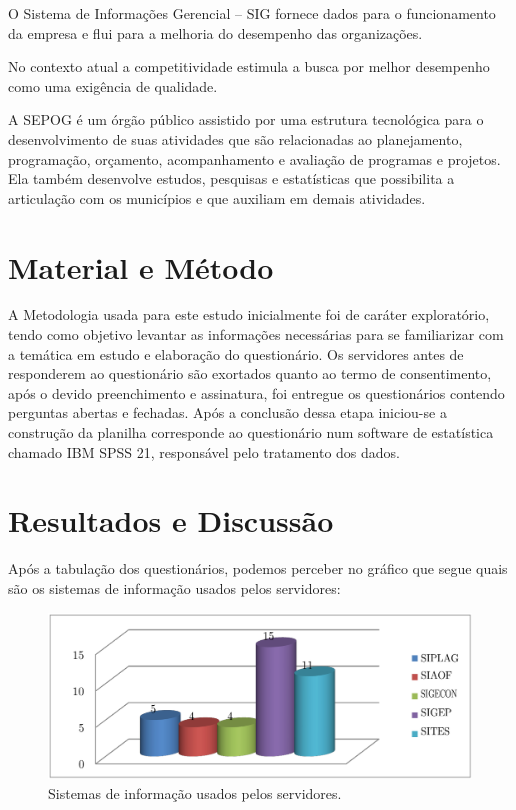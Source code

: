 \documentclass[article,12pt,onesidea,4paper,english,brazil]{abntex2}
\begin{document}
	O Sistema de Informações Gerencial – SIG fornece dados para o funcionamento da empresa e flui para a melhoria do desempenho das organizações.
	
	No contexto atual a competitividade estimula a busca por melhor desempenho como uma exigência de qualidade.
	
	A SEPOG é um órgão público assistido por uma estrutura tecnológica para o desenvolvimento de suas atividades que são relacionadas ao planejamento, programação, orçamento, acompanhamento e avaliação de programas e projetos. Ela também desenvolve estudos, pesquisas e estatísticas que possibilita a articulação com os municípios e que auxiliam em demais atividades.
	
	\section*{Material e Método}
	
	A Metodologia usada para este estudo inicialmente foi de caráter exploratório, tendo como objetivo levantar as informações necessárias para se familiarizar com a temática em estudo e elaboração do questionário. Os servidores antes de responderem ao questionário são exortados quanto ao termo de consentimento, após o devido preenchimento e assinatura, foi entregue os questionários contendo perguntas abertas e fechadas. Após a conclusão dessa etapa iniciou-se a construção da planilha corresponde ao questionário num software de estatística chamado IBM SPSS 21, responsável pelo tratamento dos dados.
	
	\section*{Resultados e Discussão}
	
	Após a tabulação dos questionários, podemos perceber no gráfico que segue quais são os sistemas de informação usados pelos servidores:
	
	\begin{figure}[!h]
		\centering
		\includegraphics[width=.6\linewidth]{pip-173-1}
		\caption{Sistemas de informação usados pelos servidores.}
	\end{figure}
\end{document}
